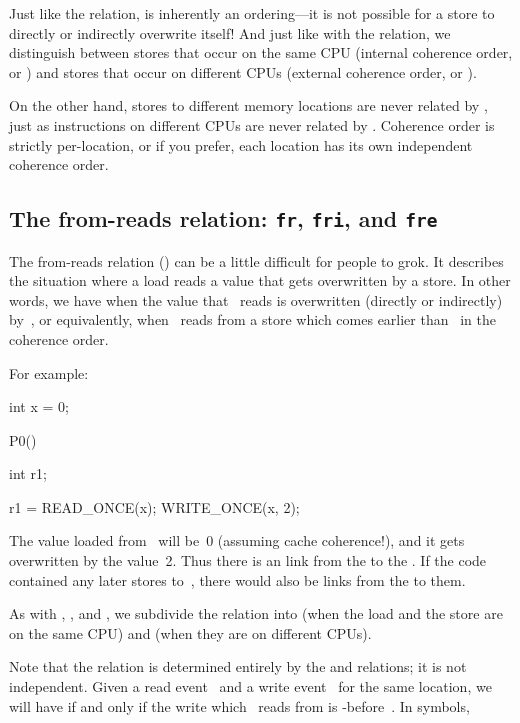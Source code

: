 Just like the  relation,  is inherently an
ordering---it is not possible for a store to directly or indirectly
overwrite itself!
And just like with the  relation, we distinguish between stores that
occur on the same CPU (internal coherence order, or ) and stores
that occur on different CPUs (external coherence order, or ).

On the other hand, stores to different memory locations are never
related by , just as instructions on different CPUs are never
related by .
Coherence order is strictly per-location, or if you prefer, each
location has its own independent coherence order.


\subsection{The from-reads relation: \texttt{fr}, \texttt{fri}, and \texttt{fre}}
\label{sec:docs:explanation:The From-reads Relation: fr, fri, and fre}

The from-reads relation () can be a little difficult for people to
grok.
It describes the situation where a load reads a value that gets
overwritten by a store.
In other words, we have  when the value that ~reads
is overwritten (directly or indirectly) by~, or equivalently,
when ~reads from a store which comes earlier than~ in
the coherence order.

For example:

\begin{VerbatimU}
	int x = 0;

	P0()
	{
		int r1;

		r1 = READ_ONCE(x);
		WRITE_ONCE(x, 2);
	}
\end{VerbatimU}

The value loaded from~ will be~0 (assuming cache coherence{!}), and it
gets overwritten by the value~2.
Thus there is an  link from the  to the
.
If the code contained any later stores to~, there would also be
 links from the  to them.

As with , , and , we subdivide the  relation
into  (when the load and the store are on the same CPU) and
 (when they are on different CPUs).

Note that the  relation is determined entirely by the  and
 relations; it is not independent.
Given a read event~ and a write event~ for the same
location, we will have  if and only if the write
which ~reads from is -before~.
In symbols,

